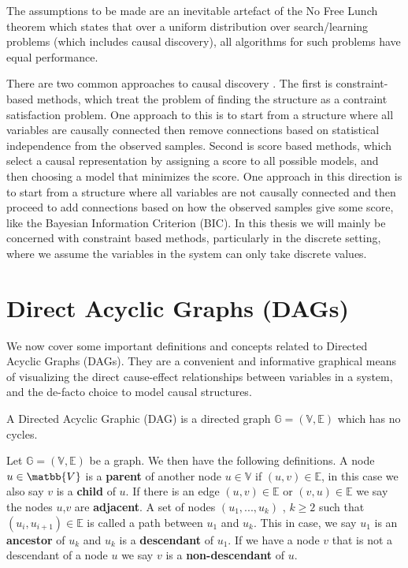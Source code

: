 \documentclass{tufte-book}
\begin{document}
The assumptions to be made are an inevitable artefact of the No Free Lunch theorem \cite{wolpert-2020-what-no} which states that over a uniform distribution over search/learning problems (which includes causal discovery), all algorithms for such problems have equal performance.

There are two common approaches to causal discovery \cite{glymour-2019-review-causal}. The first is constraint-based methods, which treat the problem of finding the structure as a contraint satisfaction problem. One approach to this is to start from a structure where all variables are causally connected then remove connections based on statistical independence from the observed samples. Second is score based methods, which select a causal representation by assigning a score to all possible models, and then choosing a model that minimizes the score. One approach in this direction is to start from a structure where all variables are not causally connected and then proceed to add connections based on how the observed samples give some score, like the Bayesian Information Criterion (BIC). In this thesis we will mainly be concerned with constraint based methods, particularly in the discrete setting, where we assume the variables in the system can only take discrete values.  



\section{Direct Acyclic Graphs (DAGs)}
\label{sec:org66162bc}
We now cover some important definitions and concepts related to Directed Acyclic Graphs (DAGs). They are a convenient and informative graphical means of visualizing the direct cause-effect relationships between variables in a system, and the de-facto choice to model causal structures.



\begin{definition}[DAGs]\label{dagdef}
    A Directed Acyclic Graphic (DAG) is a directed graph $\mathbb{G} = (\mathbb{V},\mathbb{E})$ which has no cycles.
\end{definition}

Let $\mathbb{G} = (\mathbb{V},\mathbb{E})$ be a graph. We then have the following definitions. A node $u \in \matbb{V}$ is a \textbf{parent} of another node $u \in \mathbb{V}$ if $(u,v) \in \mathbb{E}$, in this case we also say $v$ is a \textbf{child} of $u$. If there is an edge $(u,v) \in \mathbb{E}$ or $(v,u)\in \mathbb{E}$ we say the nodes $u$,$v$ are \textbf{adjacent}. A set of nodes $(u_1,...,u_k)$ , $k\geq 2$ such that $(u_i,u_{i+1}) \in \mathbb{E}$ is called a path between $u_1$ and $u_k$. This in case, we say $u_1$ is an \textbf{ancestor} of $u_k$ and $u_k$ is a \textbf{descendant} of $u_1$. If we have a node $v$ that is not a descendant of a node $u$ we say $v$ is a \textbf{non-descendant} of $u$.
\end{document}
